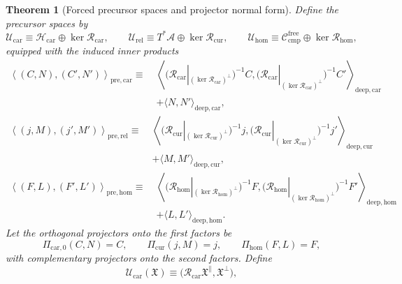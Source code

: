 \documentclass[11pt]{article}
\newcommand{\Sub}{\mathcal A}
\newcommand{\CompFree}{\mathscr C_{\mathrm{cmp}}^{\mathrm{free}}}
\newcommand{\CarrierClass}{\mathscr H_{\mathrm{car}}}
\newcommand{\PreTensorClass}{\mathscr U_{\mathrm{car}}}
\newcommand{\PreRelabelClass}{\mathscr U_{\mathrm{rel}}}
\newcommand{\PreFreeClass}{\mathscr U_{\mathrm{hom}}}
\newcommand{\PreCarProj}{\Pi_{\mathrm{car},0}}
\newcommand{\CurrentProj}{\Pi_{\mathrm{cur}}}
\newcommand{\FreeReadProj}{\Pi_{\mathrm{hom}}}
\newcommand{\DeepTensor}{\mathfrak X}
\newcommand{\CarRead}{\mathcal R_{\mathrm{car}}}
\newcommand{\CurRead}{\mathcal R_{\mathrm{cur}}}
\newcommand{\HomRead}{\mathcal R_{\mathrm{hom}}}
\newcommand{\CarIso}{\mathcal U_{\mathrm{car}}}
\newtheorem{theorem}{Theorem}
\begin{document}
\begin{theorem}[Forced precursor spaces and projector normal form]
\label{thm:normalform}
Define the precursor spaces by
\begin{equation}
\PreTensorClass\equiv \CarrierClass\oplus \ker\CarRead,
\qquad
\PreRelabelClass\equiv T^*\Sub\oplus \ker\CurRead,
\qquad
\PreFreeClass\equiv \CompFree\oplus \ker\HomRead,
\label{eq:pre_spaces_new}
\end{equation}
equipped with the induced inner products
\begin{equation}
\begin{aligned}
\left\langle (C,N),(C',N')\right\rangle_{\mathrm{pre,car}}
\equiv\;
&\left\langle
\bigl(\CarRead|_{(\ker\CarRead)^\perp}\bigr)^{-1}C,
\bigl(\CarRead|_{(\ker\CarRead)^\perp}\bigr)^{-1}C'
\right\rangle_{\mathrm{deep,car}}
\\
&+\langle N,N'\rangle_{\mathrm{deep,car}},
\end{aligned}
\label{eq:inner_pre_car}
\end{equation}
\begin{equation}
\begin{aligned}
\left\langle (j,M),(j',M')\right\rangle_{\mathrm{pre,rel}}
\equiv\;
&\left\langle
\bigl(\CurRead|_{(\ker\CurRead)^\perp}\bigr)^{-1}j,
\bigl(\CurRead|_{(\ker\CurRead)^\perp}\bigr)^{-1}j'
\right\rangle_{\mathrm{deep,cur}}
\\
&+\langle M,M'\rangle_{\mathrm{deep,cur}},
\end{aligned}
\label{eq:inner_pre_rel}
\end{equation}
\begin{equation}
\begin{aligned}
\left\langle (F,L),(F',L')\right\rangle_{\mathrm{pre,hom}}
\equiv\;
&\left\langle
\bigl(\HomRead|_{(\ker\HomRead)^\perp}\bigr)^{-1}F,
\bigl(\HomRead|_{(\ker\HomRead)^\perp}\bigr)^{-1}F'
\right\rangle_{\mathrm{deep,hom}}
\\
&+\langle L,L'\rangle_{\mathrm{deep,hom}}.
\end{aligned}
\label{eq:inner_pre_hom}
\end{equation}
Let the orthogonal projectors onto the first factors be
\begin{equation}
\PreCarProj(C,N)=C,
\qquad
\CurrentProj(j,M)=j,
\qquad
\FreeReadProj(F,L)=F,
\label{eq:projectors_new}
\end{equation}
with complementary projectors onto the second factors. Define
\begin{equation}
\CarIso(\DeepTensor)
\equiv
\bigl(\CarRead\DeepTensor^{\parallel},\DeepTensor^{\perp}\bigr),

\end{equation}
\end{theorem}
\end{document}
